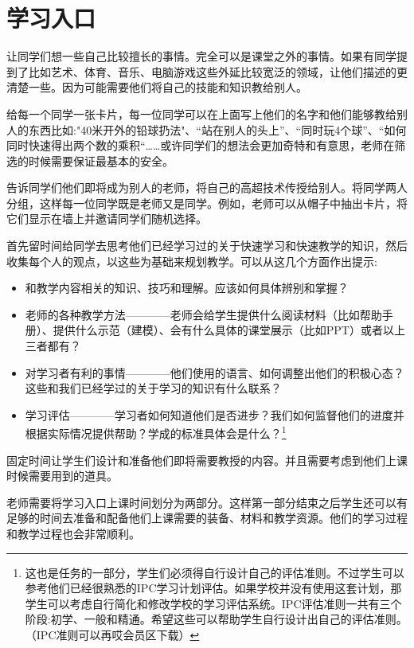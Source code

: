 \chapter{学习入口}
    让同学们想一些自己比较擅长的事情。完全可以是课堂之外的事情。如果有同学提到了比如艺术、体育、音乐、电脑游戏这些外延比较宽泛的领域，让他们描述的更清楚一些。因为可能需要他们将自己的技能和知识教给别人。\par
    给每一个同学一张卡片，每一位同学可以在上面写上他们的名字和他们能够教给别人的东西比如:"40米开外的铅球扔法"、“站在别人的头上”、“同时玩4个球”、“如何同时快速得出两个数的乘积“……或许同学们的想法会更加奇特和有意思，老师在筛选的时候需要保证最基本的安全。\par
    告诉同学们他们即将成为别人的老师，将自己的高超技术传授给别人。将同学两人分组，这样每一位同学既是老师又是同学。例如，老师可以从帽子中抽出卡片，将它们显示在墙上并邀请同学们随机选择。\par
    首先留时间给同学去思考他们已经学习过的关于快速学习和快速教学的知识，然后收集每个人的观点，以这些为基础来规划教学。可以从这几个方面作出提示:\par
    \begin{itemize}
      \item 和教学内容相关的知识、技巧和理解。应该如何具体辨别和掌握？
      \item 老师的各种教学方法————老师会给学生提供什么阅读材料（比如帮助手册）、提供什么示范（建模）、会有什么具体的课堂展示（比如PPT）或者以上三者都有？
      \item 对学习者有利的事情————他们使用的语言、如何调整出他们的积极心态？这些和我们已经学过的关于学习的知识有什么联系？
      \item  学习评估————学习者如何知道他们是否进步？我们如何监督他们的进度并根据实际情况提供帮助？学成的标准具体会是什么？\footnote{这也是任务的一部分，学生们必须得自行设计自己的评估准则。不过学生可以参考他们已经很熟悉的IPC学习计划评估。如果学校并没有使用这套计划，那学生可以考虑自行简化和修改学校的学习评估系统。IPC评估准则一共有三个阶段:初学、一般和精通。希望这些可以帮助学生自行设计出自己的评估准则。（IPC准则可以再哎会员区下载）} 
    \end{itemize}
    \par
    固定时间让学生们设计和准备他们即将需要教授的内容。并且需要考虑到他们上课时候需要用到的道具。\par
    老师需要将学习入口上课时间划分为两部分。这样第一部分结束之后学生还可以有足够的时间去准备和配备他们上课需要的装备、材料和教学资源。他们的学习过程和教学过程也会非常顺利。\par
